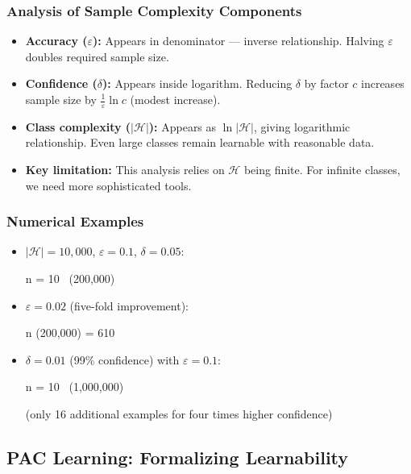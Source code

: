 \subsubsection*{Analysis of Sample Complexity Components}
\begin{itemize}
    \item \textbf{Accuracy ($\varepsilon$):} Appears in denominator — inverse relationship. Halving $\varepsilon$ doubles required sample size.
    \item \textbf{Confidence ($\delta$):} Appears inside logarithm. Reducing $\delta$ by factor $c$ increases sample size by $\frac{1}{\varepsilon}\ln c$ (modest increase).
    \item \textbf{Class complexity ($|\mathcal{H}|$):} Appears as $\ln|\mathcal{H}|$, giving logarithmic relationship. Even large classes remain learnable with reasonable data.
    \item \textbf{Key limitation:} This analysis relies on $\mathcal{H}$ being finite. For infinite classes, we need more sophisticated tools.
\end{itemize}

\subsubsection*{Numerical Examples}
\begin{itemize}
    \item $|\mathcal{H}| = 10,000$, $\varepsilon = 0.1$, $\delta = 0.05$:
    \begin{myequation}
    n \ge {}\ln{} = 10 \, \ln(200,000)  
    \end{myequation}
    \item $\varepsilon = 0.02$ (five-fold improvement):
    \begin{myequation}
    n \ge {}\ln(200,000)   = 610 
    \end{myequation}
    \item $\delta = 0.01$ (99\% confidence) with $\varepsilon = 0.1$:
    \begin{myequation}
    n \ge {}\ln{} = 10 \, \ln(1,000,000)  
    \end{myequation}
    (only 16 additional examples for four times higher confidence)
\end{itemize}

\subsection*{PAC Learning: Formalizing Learnability}

